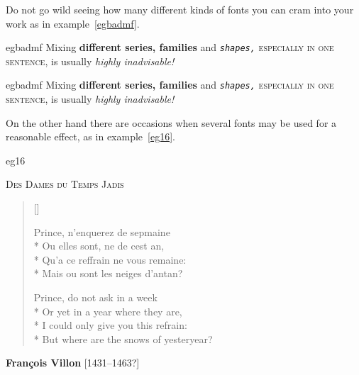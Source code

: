     Do not go wild seeing how many different kinds of fonts you can cram into
your work as in example~\ref{egbadmf}.

\begin{egsource}{egbadmf}
Mixing \textbf{different series, \textsf{families}} and
\textsl{\texttt{shapes,}} \textsc{especially in one sentence,} 
is usually \emph{highly inadvisable!}
\end{egsource}
\begin{egresult}{egbadmf}
Mixing \textbf{different series, \textsf{families}} and
\textsl{\texttt{shapes,}} \textsc{especially in one sentence,} 
is usually \emph{highly inadvisable!}
\end{egresult}

    On the other hand there are occasions when several fonts may be used
for a reasonable effect, as in example~\ref{eg16}.
\begin{egsource}{eg16}
\begin{center}
\textsc{Des Dames du Temps Jadis}
\end{center}%
\settowidth{\versewidth}{Or yet in a year where they are}
\begin{verse}[\versewidth] \begin{itshape}
Prince, n'enquerez de sepmaine \\*
Ou elles sont, ne de cest an, \\*
Qu'a ce reffrain ne vous remaine: \\*
Mais ou sont les neiges d'antan?
\end{itshape}

Prince, do not ask in a week \\*
Or yet in a year where they are, \\*
I could only give you this refrain: \\*
But where are the snows of yesteryear?
\end{verse}
\begin{flushright}
{\bfseries Fran\c{c}ois Villon} [1431--1463?]
\end{flushright}
\end{egsource}


